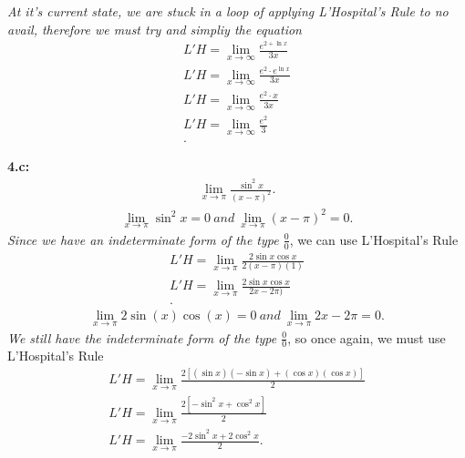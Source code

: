 \documentclass{report}
\begin{document}
\begin{mdframed}
      \bigbreak \noindent 
      \textit{At it's current state, we are stuck in a loop of applying L'Hospital's Rule to no avail, therefore we must try and simpliy the equation}
      \begin{align*}
        L'H = \lim_{x \to \infty}{\frac{e^{2+\ln{x}}}{3x}} \\
        L'H = \lim_{x \to \infty}{\frac{e^{2}\cdot e^{\ln{x}}}{3x}} \\
        L'H = \lim_{x \to \infty}{\frac{e^{2}\cdot x}{3x}} \\
        L'H = \lim_{x \to \infty}{\frac{e^{2}}{3}} \\
      .\end{align*}
      \begin{center}
        \begin{Large}
          \textbf{}
        \end{Large}
      \end{center}

      \bigbreak \noindent 
      \hspace{\parindent} \textbf{4.c:}
      \begin{align*}
        \lim_{x \to \pi}{\frac{\sin^{2}{x}}{(x-\pi)^{2}}}
      .\end{align*}
      \begin{align*}
        \lim_{x \to \pi}{\sin^{2}{x}} = 0\ and\ \lim_{x \to \pi}{(x-\pi)^{2}} = 0
      .\end{align*}
      \bigbreak \noindent 
      \textit{Since we have an indeterminate form of the type $\frac{0}{0}$}, we can use L'Hospital's Rule
      \begin{align*}
        L'H= \lim_{x \to \pi}{\frac{2\sin{x}\cos{x}}{2(x-\pi)(1)}} \\
        L'H = \lim_{x \to \pi}{\frac{2\sin{x}\cos{x}}{2x-2\pi)}} \\
      .\end{align*}
      \begin{align*}
        \lim_{x \to \pi}{2\sin{(x)}\cos{(x)}} = 0\ and\ \lim_{x \to \pi}{2x-2\pi} = 0
      .\end{align*}
      \bigbreak \noindent 
      \textit{We still have the indeterminate form of the type $\frac{0}{0}$}, so once again, we must use L'Hospital's Rule
      \begin{align*}
        L'H = \lim_{x \to \pi}{\frac{2[(\sin{x})(-\sin{x}) + (\cos{x})(\cos{x})]}{2}} \\
        L'H = \lim_{x \to \pi}{\frac{2[-\sin^{2}{x}+\cos^{2}{x}]}{2}} \\
        L'H = \lim_{x \to \pi}{\frac{-2\sin^{2}{x}+2\cos^{2}{x}}{2}}
      .\end{align*}


\end{mdframed}
\end{document}
